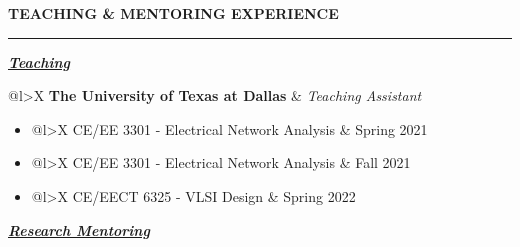 \documentclass[12pt]{article}
\begin{document}
\vspace{2em}

{\Large \textbf{TEACHING \& MENTORING EXPERIENCE}}

\textcolor{gray}{\rule{\textwidth}{2pt}}

{\large \textit{\textbf{\ul{Teaching}}}}


\begin{tabularx}{\linewidth}{{@{}l>{\raggedleft\arraybackslash}X}}
    \textbf{The University of Texas at Dallas} & \textit{Teaching Assistant}
\end{tabularx}

\begin{itemize}[noitemsep]
    \item 
    \begin{tabularx}{\linewidth}{{@{}l>{\raggedleft\arraybackslash}X}}
    CE/EE 3301 - Electrical Network Analysis & Spring 2021
    \end{tabularx}
    \item 
    \begin{tabularx}{\linewidth}{{@{}l>{\raggedleft\arraybackslash}X}}
    CE/EE 3301 - Electrical Network Analysis & Fall 2021
    \end{tabularx}
    \item 
    \begin{tabularx}{\linewidth}{{@{}l>{\raggedleft\arraybackslash}X}}
    CE/EECT 6325 - VLSI Design & Spring 2022
    \end{tabularx}
\end{itemize}

{\large \textit{\textbf{\ul{Research Mentoring}}}}
\end{document}
